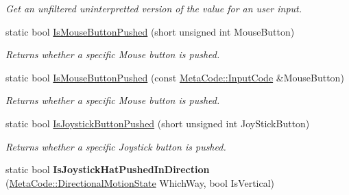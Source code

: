 \begin{DoxyCompactItemize}
\begin{DoxyCompactList}\small\item\em Get an unfiltered uninterpretted version of the value for an user input. \item\end{DoxyCompactList}\item 
static bool \hyperlink{classphys_1_1InputQueryTool_aab9a7be4d95289d828378f7f3d5fc065}{IsMouseButtonPushed} (short unsigned int MouseButton)
\begin{DoxyCompactList}\small\item\em Returns whether a specific Mouse button is pushed. \item\end{DoxyCompactList}\item 
static bool \hyperlink{classphys_1_1InputQueryTool_ab061aab57ff35cb1c18656f5ee4f384e}{IsMouseButtonPushed} (const \hyperlink{classphys_1_1MetaCode_a3e501cbb5bf0f6f1fdb7211465bda8d8}{MetaCode::InputCode} \&MouseButton)
\begin{DoxyCompactList}\small\item\em Returns whether a specific Mouse button is pushed. \item\end{DoxyCompactList}\item 
static bool \hyperlink{classphys_1_1InputQueryTool_ae3e63f8f93a0b270b22e685d3b86c890}{IsJoystickButtonPushed} (short unsigned int JoyStickButton)
\begin{DoxyCompactList}\small\item\em Returns whether a specific Joystick button is pushed. \item\end{DoxyCompactList}\item 
\hypertarget{classphys_1_1InputQueryTool_a47b0d887f62fcd43f75308c6269e8411}{
static bool {\bfseries IsJoystickHatPushedInDirection} (\hyperlink{classphys_1_1MetaCode_ad6ed6266b5f4219a6f5da29ebe018757}{MetaCode::DirectionalMotionState} WhichWay, bool IsVertical)}
\label{da/d96/classphys_1_1InputQueryTool_a47b0d887f62fcd43f75308c6269e8411}


\end{DoxyCompactItemize}
